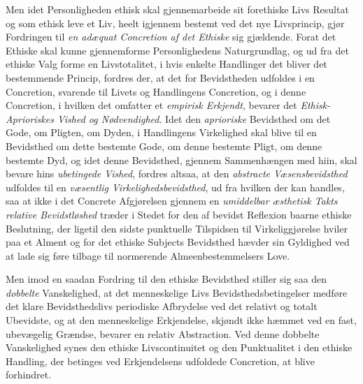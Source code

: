 Men idet Personligheden ethisk skal gjennemarbeide sit forethiske Livs Resultat
og som ethisk leve et Liv, heelt igjennem bestemt ved det nye Livsprincip, gjør
Fordringen til \emph{en adæquat Concretion af det Ethiske} sig gjældende. Forat
det Ethiske skal kunne gjennemforme Personlighedens Naturgrundlag, og ud fra det
ethiske Valg forme en Livstotalitet, i hvis enkelte Handlinger det bliver det
bestemmende Princip, fordres der, at det for Bevidstheden udfoldes i en
Concretion, svarende til Livets og Handlingens Concretion, og i denne Concretion,
i hvilken det omfatter et \emph{empirisk Erkjendt}, bevarer det
\emph{Ethisk-Aprioriskes Vished og Nødvendighed}. Idet den \emph{aprioriske}
Bevidsthed om det Gode, om Pligten, om Dyden, i Handlingens Virkelighed skal blive
til en Bevidsthed om dette bestemte Gode, om denne bestemte Pligt, om denne
bestemte Dyd, og idet denne Bevidsthed, gjennem Sammenhængen med hiin, skal bevare
hins \emph{ubetingede Vished}, fordres altsaa, at den \emph{abstracte
Væsensbevidsthed} udfoldes til en \emph{væsentlig Virkelighedsbevidsthed}, ud fra
hvilken der kan handles, saa at ikke i det Concrete Afgjørelsen gjennem en
\emph{umiddelbar æsthetisk Takts relative Bevidstløshed} træder i Stedet for den
af bevidst Reflexion baarne ethiske Beslutning, der ligetil den sidste punktuelle
Tilspidsen til Virkeliggjørelse hviler paa et Alment og for det ethiske Subjects
Bevidsthed hævder sin Gyldighed ved at lade sig føre tilbage til normerende
Almeenbestemmelsers Love.

 Men imod en saadan Fordring til den ethiske Bevidsthed stiller sig saa den
\emph{dobbelte} Vanskelighed, at det menneskelige Livs Bevidsthedsbetingelser
medføre det klare Bevidsthedslivs periodiske Afbrydelse ved det relativt og totalt
Ubevidste, og at den menneskelige Erkjendelse, skjøndt ikke hæmmet ved en fast,
ubevægelig Grændse, bevarer en relativ Abstraction. Ved denne dobbelte
Vanskelighed synes den ethiske Livscontinuitet og den Punktualitet i den ethiske
Handling, der betinges ved Erkjendelsens udfoldede Concretion, at blive
forhindret.

